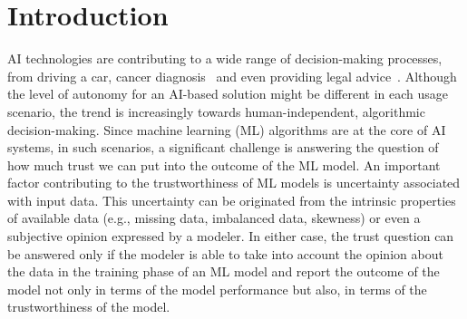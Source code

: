 \section{Introduction}
\label{intro}

AI technologies are contributing to a wide range of decision-making processes, from driving a car, cancer diagnosis~\cite{hope,sl} and even providing legal advice~\cite{deeplearning}. 
Although the level of autonomy for an AI-based solution might be different in each usage scenario, the trend is increasingly towards human-independent, algorithmic decision-making. 
Since machine learning (ML) algorithms are at the core of AI systems, in such scenarios, a significant challenge is answering the question of how much trust we can put into the outcome of the ML model. An important factor contributing to the trustworthiness of ML models is uncertainty associated with input data. This uncertainty can be originated from the intrinsic properties of available data (e.g., missing data, imbalanced data, skewness) or even a subjective opinion expressed by a modeler. In either case, the trust question can be answered only if the modeler is able to take into account the opinion about the data in the training phase of an ML model and report the outcome of the model not only in terms of the model performance but also, in terms of the trustworthiness of the model.

